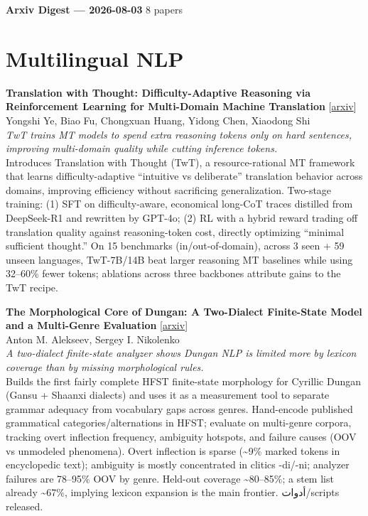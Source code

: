 \documentclass[12pt,letterpaper]{article}
\begin{document}
{\footnotesize\textbf{Arxiv Digest --- 2026-08-03} \hfill 8 papers}

\smallskip

\section*{Multilingual NLP}

{\small\textbf{Translation with Thought: Difficulty-Adaptive Reasoning via Reinforcement Learning for Multi-Domain Machine Translation}} {\scriptsize[\href{https://arxiv.org/abs/2607.29287}{arxiv}]}\\
{\scriptsize Yongshi Ye, Biao Fu, Chongxuan Huang, Yidong Chen, Xiaodong Shi}\\

{\small\textit{TwT trains MT models to spend extra reasoning tokens only on hard sentences, improving multi-domain quality while cutting inference tokens.}}\\[1pt]
{\footnotesize Introduces Translation with Thought (TwT), a resource-rational MT framework that learns difficulty-adaptive ``intuitive vs deliberate'' translation behavior across domains, improving efficiency without sacrificing generalization. Two-stage training: (1) SFT on difficulty-aware, economical long-CoT traces distilled from DeepSeek-R1 and rewritten by GPT-4o; (2) RL with a hybrid reward trading off translation quality against reasoning-token cost, directly optimizing ``minimal sufficient thought.'' On 15 benchmarks (in/out-of-domain), across 3 seen + 59 unseen languages, TwT-7B/14B beat larger reasoning MT baselines while using 32--60\% fewer tokens; ablations across three backbones attribute gains to the TwT recipe.}

\medskip

{\small\textbf{The Morphological Core of Dungan: A Two-Dialect Finite-State Model and a Multi-Genre Evaluation}} {\scriptsize[\href{https://arxiv.org/abs/2607.28766}{arxiv}]}\\
{\scriptsize Anton M. Alekseev, Sergey I. Nikolenko}\\

{\small\textit{A two-dialect finite-state analyzer shows Dungan NLP is limited more by lexicon coverage than by missing morphological rules.}}\\[1pt]
{\footnotesize Builds the first fairly complete HFST finite-state morphology for Cyrillic Dungan (Gansu + Shaanxi dialects) and uses it as a measurement tool to separate grammar adequacy from vocabulary gaps across genres. Hand-encode published grammatical categories/alternations in HFST; evaluate on multi-genre corpora, tracking overt inflection frequency, ambiguity hotspots, and failure causes (OOV vs unmodeled phenomena). Overt inflection is sparse (\textasciitilde{}9\% marked tokens in encyclopedic text); ambiguity is mostly concentrated in clitics -di/-ni; analyzer failures are 78--95\% OOV by genre. Held-out coverage \textasciitilde{}80--85\%; a stem list already \textasciitilde{}67\%, implying lexicon expansion is the main frontier. أدوات/scripts released.}
\end{document}
